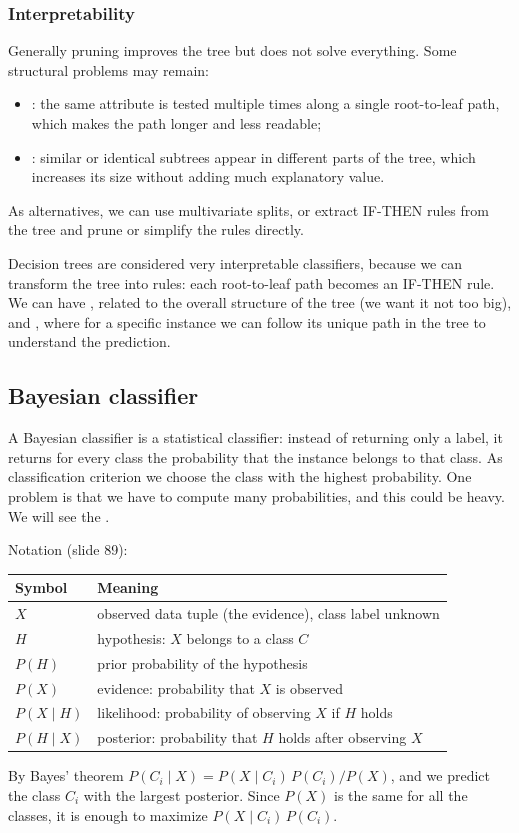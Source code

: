 \subsubsection{Interpretability}
Generally pruning improves the tree but does not solve everything. Some structural problems may remain:
\begin{itemize}
  \item {}: the same attribute is tested multiple times along a single root-to-leaf path, which makes the path longer and less readable;
  \item {}: similar or identical subtrees appear in different parts of the tree, which increases its size without adding much explanatory value.
\end{itemize}
As alternatives, we can use multivariate splits, or extract IF-THEN rules from the tree and prune or simplify the rules directly.

Decision trees are considered very interpretable classifiers, because we can transform the tree into rules: each root-to-leaf path becomes an IF-THEN rule. We can have , related to the overall structure of the tree (we want it not too big), and , where for a specific instance we can follow its unique path in the tree to understand the prediction.

\subsection{Bayesian classifier}

A Bayesian classifier is a statistical classifier: instead of returning only a label, it returns for every class the probability that the instance belongs to that class. As classification criterion we choose the class with the highest probability. One problem is that we have to compute many probabilities, and this could be heavy. We will see the .

Notation (slide 89):
\begin{center}
\begin{tabular}{@{}ll@{}}
  \toprule
  Symbol & Meaning \\
  \midrule
  $X$ & observed data tuple (the evidence), class label unknown \\
  $H$ & hypothesis: $X$ belongs to a class $C$ \\
  $P(H)$ & prior probability of the hypothesis \\
  $P(X)$ & evidence: probability that $X$ is observed \\
  $P(X \mid H)$ & likelihood: probability of observing $X$ if $H$ holds \\
  $P(H \mid X)$ & posterior: probability that $H$ holds after observing $X$ \\
  \bottomrule
\end{tabular}
\end{center}
By Bayes' theorem $P(C_i \mid X) = P(X \mid C_i)\,P(C_i)/P(X)$, and we predict the class $C_i$ with the largest posterior. Since $P(X)$ is the same for all the classes, it is enough to maximize $P(X \mid C_i)\,P(C_i)$.

